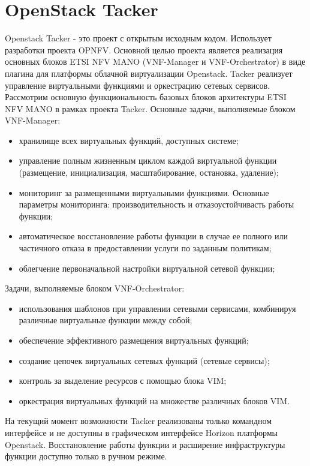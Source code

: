 \documentclass[oneside,final,14pt,a4paper]{extreport}
\begin{document}
\section{OpenStack Tacker}
Openstack Tacker - это проект с открытым исходным кодом. Использует разработки проекта OPNFV. Основной целью проекта является реализация основных блоков ETSI NFV MANO (VNF-Manager и VNF-Orchestrator) в виде плагина для платформы облачной виртуализации Openstack. Tacker реализует управление виртуальными функциями и оркестрацию сетевых сервисов.
	Рассмотрим основную функциональность базовых блоков архитектуры ETSI NFV MANO в рамках проекта Tacker. Основные задачи, выполняемые блоком VNF-Manager:
\begin{itemize}
	\item хранилище всех виртуальных функций, доступных системе;
	\item управление полным жизненным циклом каждой виртуальной функции (размещение, инициализация, масштабирование, остановка, удаление);
	\item мониторинг за размещенными виртуальными функциями. Основные параметры мониторинга: производительность и отказоустойчивасть работы функции;
	\item автоматическое восстановление работы функции в случае ее полного или частичного отказа в предоставлении услуги по заданным политикам;
	\item облегчение первоначальной настройки виртуальной сетевой функции;
\end{itemize}
Задачи, выполняемые блоком VNF-Orchestrator:
\begin{itemize}
	\item использования шаблонов при управлении сетевыми сервисами, комбинируя различные виртуальные функции между собой;
	\item обеспечение эффективного размещения виртуальных функций;
	\item создание цепочек виртуальных сетевых функций (сетевые сервисы);
	\item контроль за выделение ресурсов с помощью блока VIM;
	\item оркестрация виртуальных функций на множестве различных блоков VIM.
\end{itemize}

На текущий момент возможности Tacker реализованы только командном интерфейсе и не доступны в графическом интерфейсе Horizon платформы Openstack.\cite{tacker-official} 
Восстановление работы функции и расширение инфраструктуры функции доступно только в ручном режиме.
\end{document}
